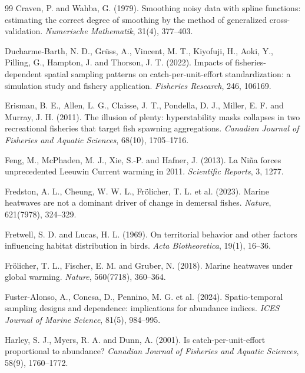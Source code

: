 \documentclass[11pt,a4paper]{article}
\begin{document}
\begin{thebibliography}{99}
Craven, P. and Wahba, G. (1979). Smoothing noisy data with spline functions: estimating the correct degree of smoothing by the method of generalized cross-validation. \textit{Numerische Mathematik}, 31(4), 377--403.

Ducharme-Barth, N. D., Gr\"uss, A., Vincent, M. T., Kiyofuji, H., Aoki, Y., Pilling, G., Hampton, J. and Thorson, J. T. (2022). Impacts of fisheries-dependent spatial sampling patterns on catch-per-unit-effort standardization: a simulation study and fishery application. \textit{Fisheries Research}, 246, 106169.

Erisman, B. E., Allen, L. G., Claisse, J. T., Pondella, D. J., Miller, E. F. and Murray, J. H. (2011). The illusion of plenty: hyperstability masks collapses in two recreational fisheries that target fish spawning aggregations. \textit{Canadian Journal of Fisheries and Aquatic Sciences}, 68(10), 1705--1716.

Feng, M., McPhaden, M. J., Xie, S.-P. and Hafner, J. (2013). La Ni\~{n}a forces unprecedented Leeuwin Current warming in 2011. \textit{Scientific Reports}, 3, 1277.

Fredston, A. L., Cheung, W. W. L., Fr\"olicher, T. L. et al. (2023). Marine heatwaves are not a dominant driver of change in demersal fishes. \textit{Nature}, 621(7978), 324--329.

Fretwell, S. D. and Lucas, H. L. (1969). On territorial behavior and other factors influencing habitat distribution in birds. \textit{Acta Biotheoretica}, 19(1), 16--36.

Fr\"olicher, T. L., Fischer, E. M. and Gruber, N. (2018). Marine heatwaves under global warming. \textit{Nature}, 560(7718), 360--364.

Fuster-Alonso, A., Conesa, D., Pennino, M. G. et al. (2024). Spatio-temporal sampling designs and dependence: implications for abundance indices. \textit{ICES Journal of Marine Science}, 81(5), 984--995.

Harley, S. J., Myers, R. A. and Dunn, A. (2001). Is catch-per-unit-effort proportional to abundance? \textit{Canadian Journal of Fisheries and Aquatic Sciences}, 58(9), 1760--1772.


\end{thebibliography}
\end{document}
